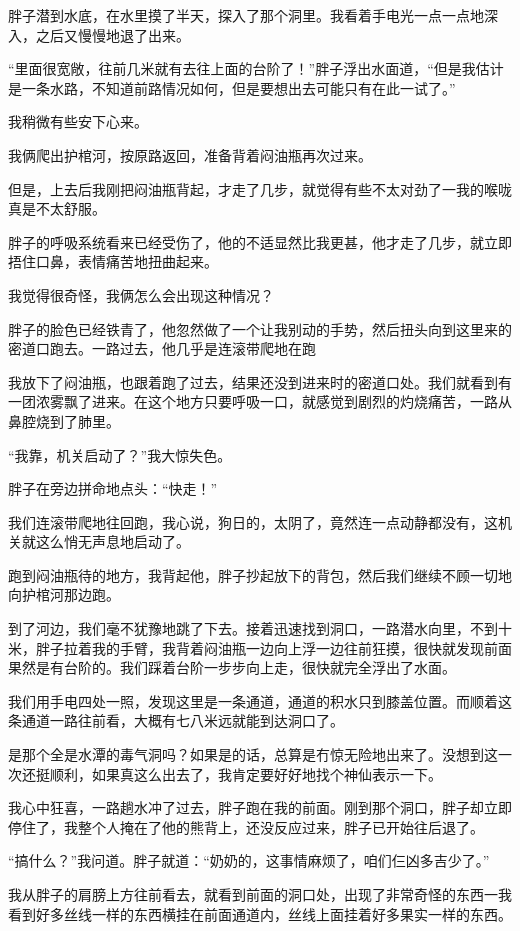 胖子潜到水底，在水里摸了半天，探入了那个洞里。我看着手电光一点一点地深入，之后又慢慢地退了出来。

“里面很宽敞，往前几米就有去往上面的台阶了！”胖子浮出水面道，“但是我估计是一条水路，不知道前路情况如何，但是要想出去可能只有在此一试了。”

我稍微有些安下心来。

我俩爬出护棺河，按原路返回，准备背着闷油瓶再次过来。

但是，上去后我刚把闷油瓶背起，才走了几步，就觉得有些不太对劲了一我的喉咙真是不太舒服。

胖子的呼吸系统看来已经受伤了，他的不适显然比我更甚，他才走了几步，就立即捂住口鼻，表情痛苦地扭曲起来。

我觉得很奇怪，我俩怎么会出现这种情况？

胖子的脸色已经铁青了，他忽然做了一个让我别动的手势，然后扭头向到这里来的密道口跑去。一路过去，他几乎是连滚带爬地在跑

我放下了闷油瓶，也跟着跑了过去，结果还没到进来时的密道口处。我们就看到有一团浓雾飘了进来。在这个地方只要呼吸一口，就感觉到剧烈的灼烧痛苦，一路从鼻腔烧到了肺里。

“我靠，机关启动了？”我大惊失色。

胖子在旁边拼命地点头：“快走！”

我们连滚带爬地往回跑，我心说，狗日的，太阴了，竟然连一点动静都没有，这机关就这么悄无声息地启动了。

跑到闷油瓶待的地方，我背起他，胖子抄起放下的背包，然后我们继续不顾一切地向护棺河那边跑。

到了河边，我们毫不犹豫地跳了下去。接着迅速找到洞口，一路潜水向里，不到十米，胖子拉着我的手臂，我背着闷油瓶一边向上浮一边往前狂摸，很快就发现前面果然是有台阶的。我们踩着台阶一步步向上走，很快就完全浮出了水面。

我们用手电四处一照，发现这里是一条通道，通道的积水只到膝盖位置。而顺着这条通道一路往前看，大概有七八米远就能到达洞口了。

是那个全是水潭的毒气洞吗？如果是的话，总算是冇惊无险地出来了。没想到这一次还挺顺利，如果真这么出去了，我肯定要好好地找个神仙表示一下。

我心中狂喜，一路趟水冲了过去，胖子跑在我的前面。刚到那个洞口，胖子却立即停住了，我整个人掩在了他的熊背上，还没反应过来，胖子已开始往后退了。

“搞什么？”我问道。胖子就道：“奶奶的，这事情麻烦了，咱们仨凶多吉少了。”

我从胖子的肩膀上方往前看去，就看到前面的洞口处，出现了非常奇怪的东西一我看到好多丝线一样的东西横挂在前面通道内，丝线上面挂着好多果实一样的东西。

